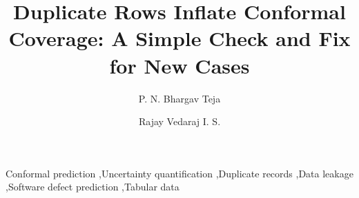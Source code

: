 \documentclass[times, review, 10pt]{elsarticle}
\date{}
\begin{document}
\hypersetup{colorlinks=true,allcolors=black}  %

\begin{frontmatter}

\title{Duplicate Rows Inflate Conformal Coverage: A Simple Check and Fix for New Cases}

\author[vit]{{\footnotesize P. N. Bhargav Teja}}
\author[vit]{{\footnotesize Rajay Vedaraj I. S.}}

\begin{abstract}

\end{abstract}

\begin{keyword}
Conformal prediction \sep Uncertainty quantification \sep Duplicate records \sep Data leakage \sep Software defect prediction \sep Tabular data
\end{keyword}

\end{frontmatter}












\end{document}
